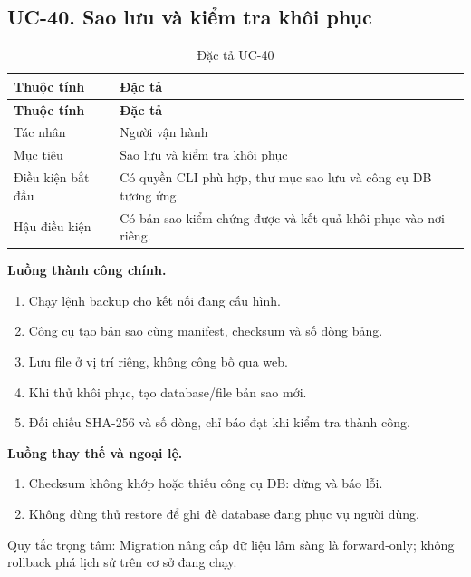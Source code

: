 \clearpage

\subsection{UC-40.\allowbreak{} Sao lưu và kiểm tra khôi phục}
\label{uc:40}

{\small\setlength{\tabcolsep}{3pt}\renewcommand{\arraystretch}{1.12}
\begin{longtable}{@{}L{\textwidth-1.32pt\relax} L{\textwidth-4.68pt\relax}@{}}
\caption{Đặc tả UC-40}\\
\toprule
\textbf{Thuộc tính} & \textbf{Đặc tả}\\\midrule
\endfirsthead
\toprule
\textbf{Thuộc tính} & \textbf{Đặc tả}\\\midrule
\endhead
\bottomrule\endlastfoot
Tác nhân & Người vận hành\\[3pt]
Mục tiêu & Sao lưu và kiểm tra khôi phục\\[3pt]
Điều kiện bắt đầu & Có quyền CLI phù hợp, thư mục sao lưu và công cụ DB tương ứng.\allowbreak{}\\[3pt]
Hậu điều kiện & Có bản sao kiểm chứng được và kết quả khôi phục vào nơi riêng.\allowbreak{}\\[3pt]
\end{longtable}}
\noindent\textbf{Luồng thành công chính.}
\begin{enumerate}
\item Chạy lệnh backup cho kết nối đang cấu hình.\allowbreak{}
\item Công cụ tạo bản sao cùng manifest, checksum và số dòng bảng.\allowbreak{}
\item Lưu file ở vị trí riêng, không công bố qua web.\allowbreak{}
\item Khi thử khôi phục, tạo database/\allowbreak{}file bản sao mới.\allowbreak{}
\item Đối chiếu SHA-256 và số dòng, chỉ báo đạt khi kiểm tra thành công.\allowbreak{}
\end{enumerate}
\noindent\textbf{Luồng thay thế và ngoại lệ.}
\begin{enumerate}
\item Checksum không khớp hoặc thiếu công cụ DB:\allowbreak{} dừng và báo lỗi.\allowbreak{}
\item Không dùng thử restore để ghi đè database đang phục vụ người dùng.\allowbreak{}
\end{enumerate}
Quy tắc trọng tâm:\allowbreak{} Migration nâng cấp dữ liệu lâm sàng là forward-only; không rollback phá lịch sử trên cơ sở đang chạy.\allowbreak{}

